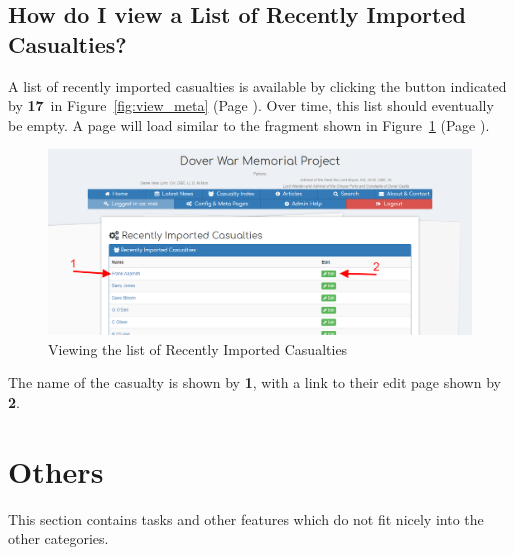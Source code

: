\documentclass[12pt]{article}
\newcommand{\marker}[1]{\color{red}\textbf{#1}\color{black}}
\newcommand{\myref}[1]{\ref{#1} {\scriptsize(Page \pageref{#1})}}
\begin{document}
\newpage
\FloatBarrier
\subsection{How do I view a List of Recently Imported Casualties?}\label{ssec:view_uploaded}
A list of recently imported casualties is available by clicking the button indicated by \marker{17}\ in Figure~\myref{fig:view_meta}. Over time, this list should eventually be empty. A page will load similar to the fragment shown in Figure~\myref{fig:view_uploaded}.

\begin{figure}[h]
  \centering
 \includegraphics[width=.9\textwidth]{pics/view_uploaded.png}
	\caption{Viewing the list of Recently Imported Casualties}\label{fig:view_uploaded}
\end{figure}

The name of the casualty is shown by \marker{1}, with a link to their edit page shown by \marker{2}.

\newpage
\FloatBarrier
\section{Others}
This section contains tasks and other features which do not fit nicely into the other categories.
\end{document}
